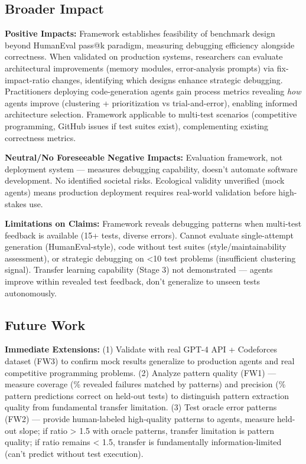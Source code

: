 \subsection{Broader Impact}

\textbf{Positive Impacts:} Framework establishes feasibility of benchmark design beyond HumanEval pass@k paradigm, measuring debugging efficiency alongside correctness. When validated on production systems, researchers can evaluate architectural improvements (memory modules, error-analysis prompts) via fix-impact-ratio changes, identifying which designs enhance strategic debugging. Practitioners deploying code-generation agents gain process metrics revealing \emph{how} agents improve (clustering + prioritization vs trial-and-error), enabling informed architecture selection. Framework applicable to multi-test scenarios (competitive programming, GitHub issues if test suites exist), complementing existing correctness metrics.

\textbf{Neutral/No Foreseeable Negative Impacts:} Evaluation framework, not deployment system — measures debugging capability, doesn't automate software development. No identified societal risks. Ecological validity unverified (mock agents) means production deployment requires real-world validation before high-stakes use.

\textbf{Limitations on Claims:} Framework reveals debugging patterns when multi-test feedback is available (15+ tests, diverse errors). Cannot evaluate single-attempt generation (HumanEval-style), code without test suites (style/maintainability assessment), or strategic debugging on <10 test problems (insufficient clustering signal). Transfer learning capability (Stage 3) not demonstrated — agents improve within revealed test feedback, don't generalize to unseen tests autonomously.

\subsection{Future Work}

\textbf{Immediate Extensions:} (1) Validate with real GPT-4 API + Codeforces dataset (FW3) to confirm mock results generalize to production agents and real competitive programming problems. (2) Analyze pattern quality (FW1) — measure coverage (\% revealed failures matched by patterns) and precision (\% pattern predictions correct on held-out tests) to distinguish pattern extraction quality from fundamental transfer limitation. (3) Test oracle error patterns (FW2) — provide human-labeled high-quality patterns to agents, measure held-out slope; if ratio > 1.5 with oracle patterns, transfer limitation is pattern quality; if ratio remains < 1.5, transfer is fundamentally information-limited (can't predict without test execution).

